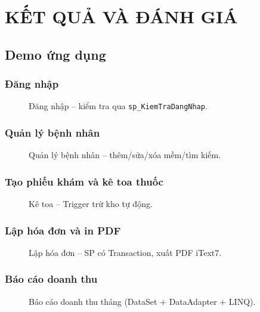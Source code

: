 \documentclass[12pt,a4paper]{report}
\begin{document}
\chapter{KẾT QUẢ VÀ ĐÁNH GIÁ}

\section{Demo ứng dụng}

\subsection{Đăng nhập}
\begin{figure}[H]
\centering
{}
\caption{Đăng nhập -- kiểm tra qua \texttt{sp\_KiemTraDangNhap}.}
\end{figure}

\subsection{Quản lý bệnh nhân}
\begin{figure}[H]
\centering
{}
\caption{Quản lý bệnh nhân -- thêm/sửa/xóa mềm/tìm kiếm.}
\end{figure}

\subsection{Tạo phiếu khám và kê toa thuốc}
\begin{figure}[H]
\centering
{}
\caption{Kê toa -- Trigger trừ kho tự động.}
\end{figure}

\subsection{Lập hóa đơn và in PDF}
\begin{figure}[H]
\centering
{}
\caption{Lập hóa đơn -- SP có Transaction, xuất PDF iText7.}
\end{figure}

\subsection{Báo cáo doanh thu}
\begin{figure}[H]
\centering
{}
\caption{Báo cáo doanh thu tháng (DataSet + DataAdapter + LINQ).}
\end{figure}
\end{document}
